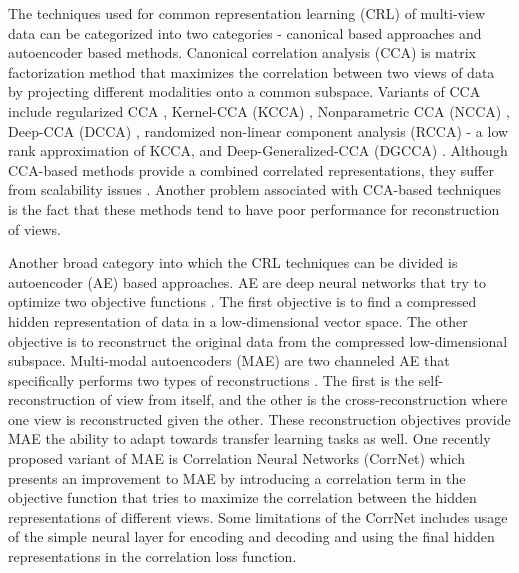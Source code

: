\documentclass[10pt, a4paper, conference, compsocconf]{IEEEtran}
\begin{document}
The techniques used for common representation learning (CRL) of multi-view data can be categorized into two categories - canonical based approaches and autoencoder based methods. Canonical correlation analysis (CCA) \cite{hardle2007canonical,thompson2005canonical} is matrix factorization method that maximizes the correlation between two views of data by projecting different modalities onto a common subspace. Variants of CCA include regularized CCA \cite{vinod1976reg_cca}, Kernel-CCA (KCCA) \cite{akaho2006kcca,yu2014kcca,bach2002kcca}, Nonparametric CCA (NCCA) \cite{michaeli2016ncca}, Deep-CCA (DCCA) \cite{andrew2013dcca}, randomized non-linear component analysis (RCCA) \cite{mineiro2014rcca} - a low rank approximation of KCCA, and Deep-Generalized-CCA (DGCCA) \cite{benton2017dgcca}. Although CCA-based methods provide a combined correlated representations, they suffer from scalability issues \cite{chandar2016correlational}. Another problem associated with CCA-based techniques is the fact that these methods tend to have poor performance for reconstruction of views. 

Another broad category into which the CRL techniques can be divided is autoencoder (AE) based approaches. AE are deep neural networks that try to optimize two objective functions \cite{ng2011auto,li2015auto}. The first objective is to find a compressed hidden representation of data in a low-dimensional vector space. The other objective is to reconstruct the original data from the compressed low-dimensional subspace. Multi-modal autoencoders (MAE) are two channeled AE that specifically performs two types of reconstructions \cite{ngiam2011multimodal}. The first is the self-reconstruction of view from itself, and the other is the cross-reconstruction where one view is reconstructed given the other. These reconstruction objectives provide MAE the ability to adapt towards transfer learning tasks as well. One recently proposed variant of MAE is Correlation Neural Networks (CorrNet) \cite{chandar2016correlational} which presents an improvement to MAE by introducing a correlation term in the objective function that tries to maximize the correlation between the hidden representations of different views. Some limitations of the CorrNet includes usage of the simple neural layer for encoding and decoding and using the final hidden representations in the correlation loss function.
\end{document}
